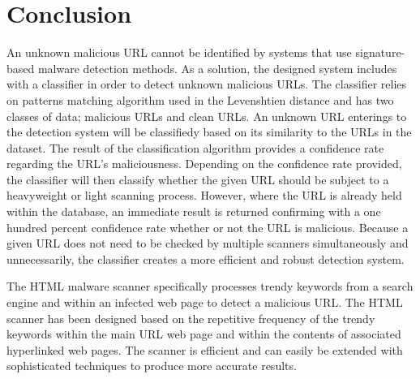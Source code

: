 \section{Conclusion}

An unknown malicious URL cannot be identified by systems that use signature-based malware detection methods. As a solution, the designed system includes with a classifier in order to detect unknown malicious URLs. The classifier relies on patterns matching algorithm used in the Levenshtien distance and has two classes of data; malicious URLs and clean URLs. An unknown URL enterings to the detection system will be classifiedy based on its similarity to the URLs in the dataset. The result of the classification algorithm provides a confidence rate regarding the URL’s maliciousness. Depending on the confidence rate provided, the classifier will then classify whether the given URL should be subject to a heavyweight or light scanning process. However, where the URL is already held within the database, an immediate result is returned confirming with a one hundred percent confidence rate whether or not the URL is malicious. Because a given URL does not need to be checked by multiple scanners simultaneously and unnecessarily, the classifier creates a more efficient and robust detection system. 
   
The HTML malware scanner specifically processes trendy keywords from a search engine and within an infected web page to detect a malicious URL. The HTML scanner has been designed based on the repetitive frequency of the trendy keywords within the main URL web page and within the contents of associated hyperlinked web pages. The scanner is efficient and can easily be extended with sophisticated techniques to produce more accurate results. 
